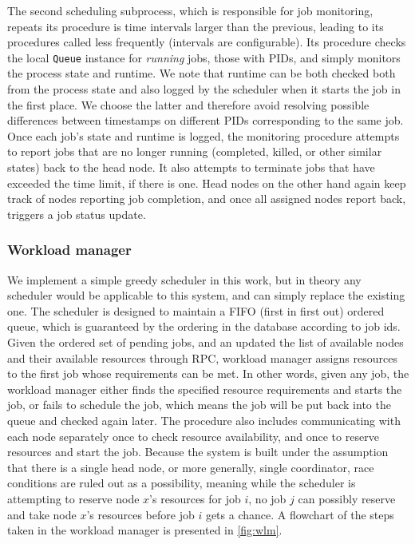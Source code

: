 \documentclass[sigconf]{acmart}
\begin{document}
The second scheduling subprocess, which is responsible for job monitoring, repeats its procedure is time intervals larger than
the previous, leading to its procedures called less frequently (intervals are configurable).
Its procedure checks the local \verb|Queue| instance for \textit{running} jobs, those with PIDs, and simply monitors the process
state and runtime. We note that runtime can be both checked both from the process state and also logged by the scheduler when it
starts the job in the first place. We choose the latter and therefore avoid resolving possible differences between timestamps on
different PIDs corresponding to the same job.
Once each job's state and runtime is logged, the monitoring procedure attempts to report jobs that are no longer running
(completed, killed, or other similar states) back to the head node. It also attempts to terminate jobs that have exceeded the
time limit, if there is one.
Head nodes on the other hand again keep track of nodes reporting job completion, and once all assigned nodes report back,
triggers a job status update.

\subsubsection{Workload manager}
\label{sec:wlm}
We implement a simple greedy scheduler in this work, but in theory any scheduler would be applicable to this system, and can
simply replace the existing one.
The scheduler is designed to maintain a FIFO (first in first out) ordered queue, which is guaranteed by the ordering in the
database according to job ids.
Given the ordered set of pending jobs, and an updated the list of available nodes and their available resources through
RPC, workload manager assigns resources to the first job whose requirements can be met.
In other words, given any job, the workload manager either finds the specified resource requirements and starts the job, or
fails to schedule the job, which means the job will be put back into the queue and checked again later.
The procedure also includes communicating with each node separately once to check resource availability, and once to reserve
resources and start the job.
Because the system is built under the assumption that there is a single head node, or more generally, single coordinator, race
conditions are ruled out as a possibility, meaning while the scheduler is attempting to reserve node $x$'s resources for job
$i$, no job $j$ can possibly reserve and take node $x$'s resources before job $i$ gets a chance.
A flowchart of the steps taken in the workload manager is presented in \cref{fig:wlm}.
\end{document}
